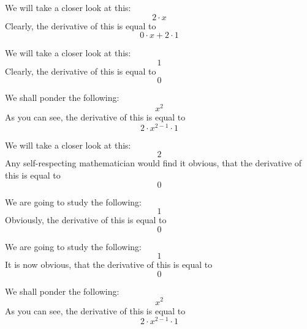 \documentclass{article}
\begin{document}
We will take a closer look at this:
\begin{equation}
2 \cdot x 
\end{equation}
Clearly, the derivative of this is equal to
\begin{equation}
0 \cdot x + 2 \cdot 1 
\end{equation}

We will take a closer look at this:
\begin{equation}
1 
\end{equation}
Clearly, the derivative of this is equal to
\begin{equation}
0 
\end{equation}

We shall ponder the following:
\begin{equation}
x ^{2 } 
\end{equation}
As you can see, the derivative of this is equal to
\begin{equation}
2 \cdot x ^{2 - 1 } \cdot 1 
\end{equation}

We will take a closer look at this:
\begin{equation}
2 
\end{equation}
Any self-respecting mathematician would find it obvious, that the derivative of this is equal to
\begin{equation}
0 
\end{equation}

We are going to study the following:
\begin{equation}
1 
\end{equation}
Obviously, the derivative of this is equal to
\begin{equation}
0 
\end{equation}

We are going to study the following:
\begin{equation}
1 
\end{equation}
It is now obvious, that the derivative of this is equal to
\begin{equation}
0 
\end{equation}

We shall ponder the following:
\begin{equation}
x ^{2 } 
\end{equation}
As you can see, the derivative of this is equal to
\begin{equation}
2 \cdot x ^{2 - 1 } \cdot 1 
\end{equation}
\end{document}
